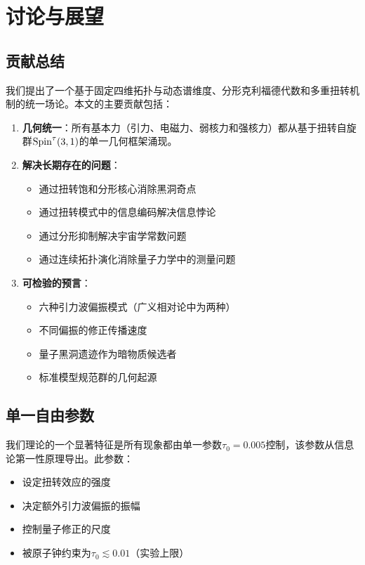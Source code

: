\section{讨论与展望}
\label{sec:outlook}

\subsection{贡献总结}

我们提出了一个基于固定四维拓扑与动态谱维度、分形克利福德代数和多重扭转机制的统一场论。本文的主要贡献包括：

\begin{enumerate}
    \item \textbf{几何统一}：所有基本力（引力、电磁力、弱核力和强核力）都从基于扭转自旋群$\mathrm{Spin}^\tau(3,1)$的单一几何框架涌现。
    
    \item \textbf{解决长期存在的问题}：
    \begin{itemize}
        \item 通过扭转饱和分形核心消除黑洞奇点
        \item 通过扭转模式中的信息编码解决信息悖论
        \item 通过分形抑制解决宇宙学常数问题
        \item 通过连续拓扑演化消除量子力学中的测量问题
    \end{itemize}
    
    \item \textbf{可检验的预言}：
    \begin{itemize}
        \item 六种引力波偏振模式（广义相对论中为两种）
        \item 不同偏振的修正传播速度
        \item 量子黑洞遗迹作为暗物质候选者
        \item 标准模型规范群的几何起源
    \end{itemize}
\end{enumerate}

\subsection{单一自由参数}

我们理论的一个显著特征是所有现象都由单一参数$\tau_0 = 0.005$控制，该参数从信息论第一性原理导出。此参数：

\begin{itemize}
    \item 设定扭转效应的强度
    \item 决定额外引力波偏振的振幅
    \item 控制量子修正的尺度
    \item 被原子钟约束为$\tau_0 \lesssim 0.01$（实验上限）
\end{itemize}

